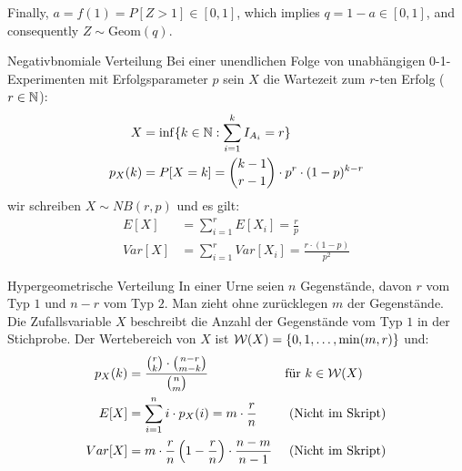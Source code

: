 Finally, $a = f(1) = P[Z > 1] \in [0, 1]$, which implies $q = 1 - a \in [0, 1]$, and consequently $Z \sim \text{Geom}(q)$.
\BoxEnd{}
\begin{definition}{Negativbnomiale Verteilung}
Bei einer unendlichen Folge von unabhängigen 0-1-Experimenten mit
Erfolgsparameter $p$ sein $X$ die Wartezeit zum $r$-ten Erfolg ($r \in \mathbb{N}$):
\begin{align*}
  X       & = \inf \{ k \in \mathbb{N} : \sum_{i = 1}^k I_{A_i} = r \}         \\
  p_X (k) & = P[X = k] = \binom{k-1}{r-1} \cdot p^r \cdot  (1-p)^{k-r}
\end{align*}
wir schreiben $X \sim NB (r, p)$ und es gilt:
\begin{align*}
  E[X]   & = \sum_{i = 1}^r E[X_i] = \frac{r}{p}                  \\
  Var[X] & = \sum_{i = 1}^r Var[X_i] = \frac{r \cdot  (1-p)}{p^2}
\end{align*}
\end{definition}
\begin{definition}{Hypergeometrische Verteilung}
In einer Urne seien $n$ Gegenstände, davon $r$ vom Typ $1$ und $n-r$ vom Typ
$2$. Man zieht ohne zurücklegen $m$ der Gegenstände. Die Zufallsvariable $X$
beschreibt die Anzahl der Gegenstände vom Typ $1$ in der Stichprobe. Der
Wertebereich von $X$ ist $\mathcal{W} (X) = \{0, 1, \dots, \min (m, r)\}$ und:
\begin{align*}
  p_X (k) & = \frac{\binom{r}{k} \cdot \binom{n-r}{m-k}}{\binom{n}{m}}
          &                                                                                 & \text{für } k \in \mathcal{W} (X)                             \\
  E[X]    & = \sum_{i = 1}^n i \cdot p_X (i) = m \cdot \frac{r}{n}                                     &                          & \text{ (Nicht im Skript)} \\
  Var[X]  & = m \cdot \frac{r}{n} \left(1 - \frac{r}{n} \right) \cdot \frac{n - m}{n - 1} &                          & \text{ (Nicht im Skript)}
\end{align*}
\end{definition}
